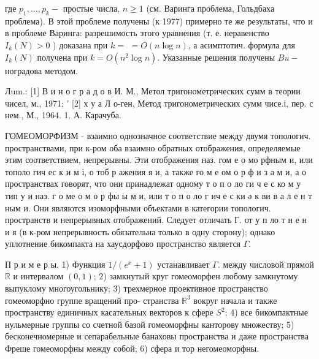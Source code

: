 \documentclass[10pt]{article}
\begin{document}
где $p_{1}, \ldots, p_{k}-$ простые числа, $n \geqslant 1$ (см. Варинга проблема, Гольдбаха проблема). В этой проблеме получены (к 1977) примерно те же результаты, что и в проблеме Варинга: разрешимость этого уравнения (т. е. неравенство $I_{k}(N)>0$ ) доказана при $k=$ $=O(n \log n)$, а асимптотич. формула для $I_{k}(N)$ получена при $k=O\left(n^{2} \log n\right)$. Указанные решения получены $B u-$ ноградова методом.



Лum.: [1] В и н о г р а д о в И. М., Метол тригонометрических сумм в теории чисел, м., 1971; ' [2] х у а Л о-ген, Метод тригонометрических сумм чисе.і, пер. с нем., М., 1964. 1. А. Карачуба.



ГОМЕОМОРФИЗМ - взаимно однозначное соответствие между двумя топологич. пространствами, при к-ром оба взаимно обратных отображения, определяемые этим соответствием, непрерывны. Эти отображения наз. гом е о мо рфным и, или тополо гич ес к и м і, о тоб р ажения я и, а также го м е ом о р ф и з а м и, а о пространствах говорят, что они принадлежат одному т о п о ло ги ч е с ко м у тип у и наз. г о ме о м о р фы ы м и, или т о п о ло г ич е с ки ә к ви в а л е н т ным и. Они являются изоморфными объектами в категории топологич. пространств и непрерывных отображений. Следует отличать Г. от у п ло т н е н и я (в к-ром непрерывность обязательна только в одну сторону); однако уплотнение бикомпакта на хаусдорфово пространство является $\Gamma$.



П р и м е р ы. 1) Функция $1 /\left(e^{x}+1\right)$ устанавливает $\Gamma$. между числовой прямой $\mathbb{R}$ и интервалом $(0,1)$; 2) замкнутый круг гомеоморфен любому замкнутому выпуклому многоугольнику; 3) трехмерное проективное пространство гомеоморфно группе вращений про- странства $\mathbb{R}^{3}$ вокруг начала и также пространству единичных касательных векторов к сфере $S^{2}$; 4) все бикомпактные нульмерные группы со счетной базой гомеоморфны канторову множеству; 5) бесконечномерные и сепарабельные банаховы пространства и даже пространства Фреше гомеоморфны между собой; 6) сфера и тор негомеоморфны.
\end{document}
